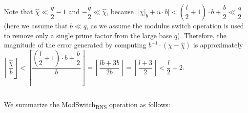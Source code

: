 Note that $\hat\chi \ll \dfrac{q}{2}-1$ and $-\dfrac{q}{2} \ll \hat\chi$, because $\Big||\chi|_b + u\cdot b\Big| < \left(\dfrac{l}{2} + 1\right)\cdot b + \dfrac{b}{2} \ll \dfrac{q}{2}$ (here we assume that $b \ll q$, as we assume the modulus switch operation is used to remove only a single prime factor from the large base $q$). Therefore, the magnitude of the error generated by computing $ b^{-1} \cdot (\chi - \hat\chi)$ is approximately $\left\lceil\dfrac{\hat\chi}{b}\right\rfloor <  \left\lceil\dfrac{\left(\dfrac{l}{2} + 1\right)\cdot b + \dfrac{b}{2}}{b}\right\rfloor = \left\lceil\dfrac{lb + 3b}{2b}\right\rfloor = \left\lceil\dfrac{l + 3}{2}\right\rfloor < \dfrac{l}{2} + 2$. 


$ $

We summarize the \textsf{ModSwitch\textsubscript{RNS}} operation as follows:



